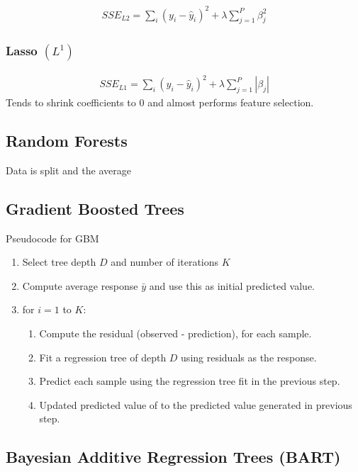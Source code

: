 \documentclass[12pt]{article}
\begin{document}
\begin{align*}
  SSE_{L2} = \sum_i (y_i - \hat y_i)^2 + \lambda\sum_{j=1}^P \beta_j^2
\end{align*}

\subsubsection{Lasso $(L^1)$}

\begin{align*}
  SSE_{L1} = \sum_i (y_i - \hat y_i)^2 + \lambda\sum_{j=1}^P |\beta_j|
\end{align*}
Tends to shrink coefficients to 0 and almost performs feature selection. 

\subsection{Random Forests}

Data is split and the average

\subsection{Gradient Boosted Trees}

Pseudocode for GBM \cite{CASI,}
\begin{enumerate}
\item Select tree depth $D$ and number of iterations $K$
\item Compute average response $\bar y$ and use this as initial predicted value.
\item for $i = 1$ to $K$:
  \begin{enumerate}
  \item Compute the residual (observed - prediction), for each sample.
  \item Fit a regression tree of depth $D$ using residuals as the response.
  \item Predict each sample using the regression tree fit in the previous step.
  \item Updated predicted value of to the predicted value generated in previous step.
  \end{enumerate}
\end{enumerate}



\subsection{Bayesian Additive Regression Trees (BART)}
\end{document}
